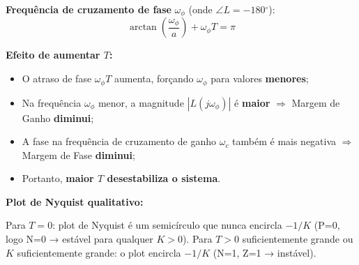\documentclass[12pt,a4paper]{article}
\newcommand{\degrees}{\ensuremath{^{\circ}}}
\begin{document}
\textbf{Frequência de cruzamento de fase} $\omega_\phi$ (onde $\angle L = -180\degrees$):
\[
  \arctan\!\!\left(\frac{\omega_\phi}{a}\right) + \omega_\phi T = \pi
\]

\textbf{Efeito de aumentar $T$:}
\begin{itemize}
  \item O atraso de fase $\omega_\phi T$ aumenta, forçando $\omega_\phi$ para valores \textbf{menores};
  \item Na frequência $\omega_\phi$ menor, a magnitude $|L(j\omega_\phi)|$ é \textbf{maior}
        $\Rightarrow$ Margem de Ganho \textbf{diminui};
  \item A fase na frequência de cruzamento de ganho $\omega_c$ também é mais negativa
        $\Rightarrow$ Margem de Fase \textbf{diminui};
  \item Portanto, \textbf{maior $T$ desestabiliza o sistema}.
\end{itemize}

\textbf{Plot de Nyquist qualitativo:}

\begin{center}
\end{center}

Para $T = 0$: plot de Nyquist é um semicírculo que nunca encircla $-1/K$
(P=0, logo N=0 → estável para qualquer $K > 0$).
Para $T > 0$ suficientemente grande ou $K$ suficientemente grande: o plot
encircla $-1/K$ (N=1, Z=1 → instável).

\end{document}
